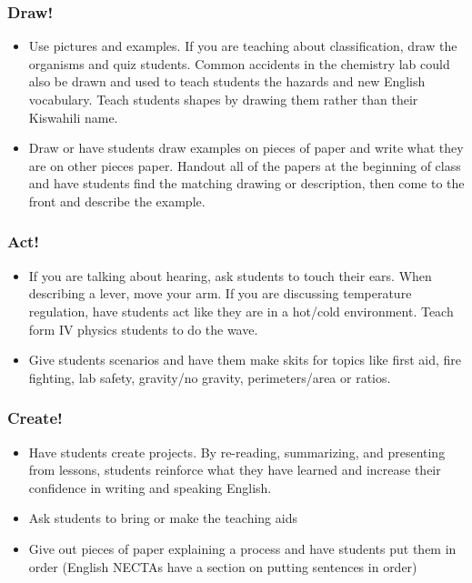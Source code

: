 \documentclass[12pt,a4paper]{report}
\begin{document}
\subsubsection{Draw!}
\begin{itemize}
\item{Use pictures and examples. If you are teaching about classification, draw the organisms and quiz students. Common accidents in the chemistry lab could also be drawn and used to teach students the hazards and new English vocabulary. Teach students shapes by drawing them rather than their Kiswahili name.}

\item{Draw or have students draw examples on pieces of paper and write what they are on other pieces paper. Handout all of the papers at the beginning of class and have students find the matching drawing or description, then come to the front and describe the example.}
\end{itemize}

\subsubsection{Act!} 
\begin{itemize}
\item{If you are talking about hearing, ask students to touch their ears. When describing a lever, move your arm. If you are discussing temperature regulation, have students act like they are in a hot/cold environment. Teach form IV physics students to do the wave.}

\item{Give students scenarios and have them make skits for topics like first aid, fire fighting, lab safety, gravity/no gravity, perimeters/area or ratios.}
\end{itemize}

\subsubsection{Create!}
\begin{itemize}
\item{Have students create projects. By re-reading, summarizing, and presenting from lessons, students reinforce what they have learned and increase their confidence in writing and speaking English.}

\item{Ask students to bring or make the teaching aids}

\item{Give out pieces of paper explaining a process and have students put them in order (English NECTAs have a section on putting sentences in order)}

\end{itemize}
\end{document}
